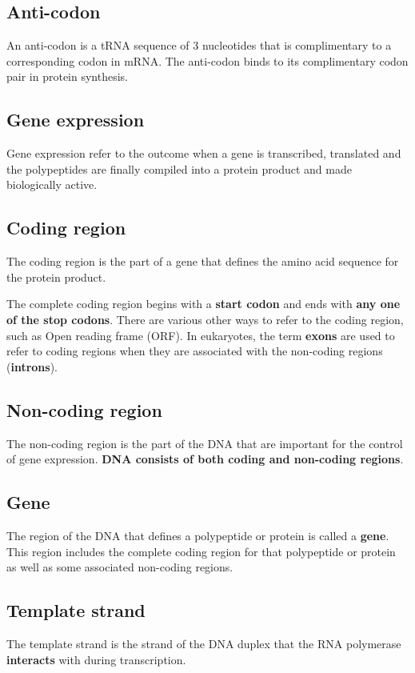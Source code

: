 \documentclass[11pt]{article}
\begin{document}
\subsection{Anti-codon}
\label{sec:org2ef772e}
An anti-codon is a tRNA sequence of 3 nucleotides that is complimentary to a corresponding codon in mRNA. The anti-codon binds to its complimentary codon pair in protein synthesis.
\subsection{Gene expression}
\label{sec:orgb3e2fb7}
Gene expression refer to the outcome when a gene is transcribed, translated and the polypeptides are finally compiled into a protein product and made biologically active.
\subsection{Coding region}
\label{sec:org2133c38}
The coding region is the part of a gene that defines the amino acid sequence for the protein product.


The complete coding region begins with a \textbf{start codon} and ends with \textbf{any one of the stop codons}. There are various other ways to refer to the coding region, such as Open reading frame (ORF). In eukaryotes, the term \textbf{exons} are used to refer to coding regions when they are associated with the non-coding regions (\textbf{introns}).
\subsection{Non-coding region}
\label{sec:orgef2aa79}
The non-coding region is the part of the DNA that are important for the control of gene expression. \textbf{DNA consists of both coding and non-coding regions}.
\subsection{Gene}
\label{sec:org72aabaa}
The region of the DNA that defines a polypeptide or protein is called a \textbf{gene}. This region includes the complete coding region for that polypeptide or protein as well as some associated non-coding regions.
\subsection{Template strand}
\label{sec:org4059be1}
The template strand is the strand of the DNA duplex that the RNA polymerase \textbf{interacts} with during transcription.
\end{document}
